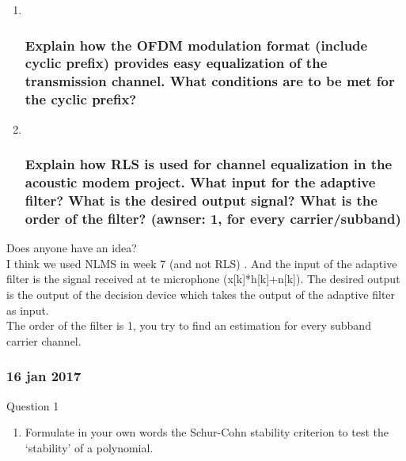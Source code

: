 \documentclass[
  a4paper,
  ,captions=tableheading
]{scrartcl}
\providecommand{\tightlist}{%
  \setlength{\itemsep}{0pt}\setlength{\parskip}{0pt}}
\begin{document}
\begin{enumerate}
\def\labelenumi{\arabic{enumi}.}
\item ~
  \subsubsection{Explain how the OFDM modulation format (include cyclic
  prefix) provides easy equalization of the transmission channel. What
  conditions are to be met for the cyclic
  prefix?}\label{explain-how-the-ofdm-modulation-format-include-cyclic-prefix-provides-easy-equalization-of-the-transmission-channel.-what-conditions-are-to-be-met-for-the-cyclic-prefix}
\item ~
  \subsubsection{Explain how RLS is used for channel equalization in the
  acoustic modem project. What input for the adaptive filter? What is
  the desired output signal? What is the order of the filter? (awnser:
  1, for every
  carrier/subband)}\label{explain-how-rls-is-used-for-channel-equalization-in-the-acoustic-modem-project.-what-input-for-the-adaptive-filter-what-is-the-desired-output-signal-what-is-the-order-of-the-filter-awnser-1-for-every-carriersubband}
\end{enumerate}

Does anyone have an idea?\\
I think we used NLMS in week 7 (and not RLS) . And the input of the
adaptive filter is the signal received at te microphone
(x{[}k{]}*h{[}k{]}+n{[}k{]}). The desired output is the output of the
decision device which takes the output of the adaptive filter as
input.\\
The order of the filter is 1, you try to find an estimation for every
subband carrier channel.

\subsubsection{}\label{section-24}

\subsubsection{\texorpdfstring{\textbf{16 jan
2017}}{16 jan 2017}}\label{jan-2017}

Question 1

\begin{enumerate}
\def\labelenumi{\arabic{enumi}.}
\tightlist
\item
  Formulate in your own words the Schur-Cohn stability criterion to test
  the `stability' of a polynomial.
\end{enumerate}
\end{document}
